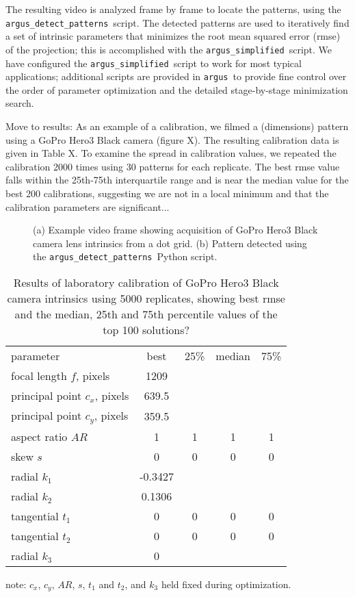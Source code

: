 \documentclass[fleqn,10pt]{wlpeerj}
\newcommand{\argus}{\texttt{argus}}
\newcommand{\detectpatterns}{\texttt{argus\_detect\_patterns}}
\newcommand{\simplified}{\texttt{argus\_simplified}}
\begin{document}
The resulting video is analyzed frame by frame to locate the patterns, using the \detectpatterns\ script.  The detected patterns are used to iteratively find a set of intrinsic parameters that minimizes the root mean squared error (rmse) of the projection; this is accomplished with the \simplified\ script.  We have configured the \simplified\ script to work for most typical applications; additional scripts are provided in \argus\ to provide fine control over the order of parameter optimization and the detailed stage-by-stage minimization search.

Move to results: As an example of a calibration, we filmed a (dimensions) pattern using a GoPro Hero3 Black camera (figure X).  The resulting calibration data is given in Table X. To examine the spread in calibration values, we repeated the calibration 2000 times using 30 patterns for each replicate. The best rmse value falls within the 25th-75th interquartile range and is near the median value for the best 200 calibrations, suggesting we are not in a local minimum and that the calibration parameters are significant...   

\begin{figure}
\caption{(a) Example video frame showing acquisition of GoPro Hero3 Black camera lens intrinsics from a dot grid.  (b) Pattern detected using the \detectpatterns\ Python script.}
\label{fig:labcal1}
\end{figure}

\begin{table}
\caption{Results of laboratory calibration of GoPro Hero3 Black camera intrinsics using 5000 replicates, showing best rmse and the median, 25th and 75th percentile values of the top 100 solutions? }
\label{tab:labcal2}
\begin{center}
\begin{tabular}{lcccc}
parameter & best & 25\% & median & 75\% \\
\cline{1-5}
focal length $f$, pixels & 1209 & & &\\
principal point $c_x$, pixels & 639.5 & & & \\
principal point $c_y$, pixels & 359.5 & & & \\
aspect ratio $AR$ & 1 & 1 & 1 & 1\\
skew $s$ & 0 & 0 & 0 & 0 \\
radial $k_1$ & -0.3427 & & & \\
radial $k_2$ & 0.1306 & & & \\
tangential $t_1$ & 0 & 0 & 0 & 0 \\
tangential $t_2$ & 0 & 0 & 0 & 0 \\
radial $k_3$ & 0 & & & \\
\end{tabular}
\end{center}
note: $c_x$, $c_y$, $AR$, $s$, $t_1$ and $t_2$, and $k_3$ held fixed during optimization.
\end{table}
\end{document}
